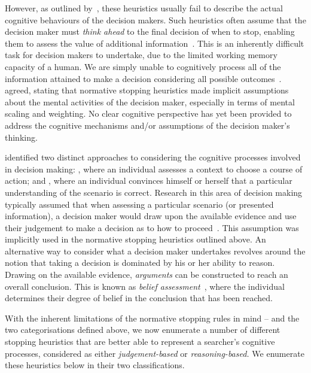 However, as outlined by~\cite{browne2004stopping_rules}, these heuristics usually fail to describe the actual cognitive behaviours of the decision makers. Such heuristics often assume that the decision maker must \emph{think ahead} to the final decision of when to stop, enabling them to assess the value of additional information~\citep{busemeyer1988deferred_decision_making}. This is an inherently difficult task for decision makers to undertake, due to the limited working memory capacity of a human. We are simply unable to cognitively process all of the information attained to make a decision considering all possible outcomes~\citep{browne2004stopping_rules}.~\cite{nickles1995judgment} agreed, stating that normative stopping heuristics made implicit assumptions about the mental activities of the decision maker, especially in terms of mental scaling and weighting. No clear cognitive perspective has yet been provided to address the cognitive mechanisms and/or assumptions of the decision maker's thinking.

\cite{nickles1995judgment} identified two distinct approaches to considering the cognitive processes involved in decision making: , where an individual assesses a context to choose a course of action; and , where an individual convinces himself or herself that a particular understanding of the scenario is correct. Research in this area of decision making typically assumed that when assessing a particular scenario (or presented information), a decision maker would draw upon the available evidence and use their judgement to make a decision as to how to proceed~\citep{reisberg1997cognition}. This assumption was implicitly used in the normative stopping heuristics outlined above. An alternative way to consider what a decision maker undertakes revolves around the notion that taking a decision is dominated by his or her ability to reason. Drawing on the available evidence, \emph{arguments} can be constructed to reach an overall conclusion. This is known as \emph{belief assessment}~\citep{benson1995belief_assessment}, where the individual determines their degree of belief in the conclusion that has been reached.

With the inherent limitations of the normative stopping rules in mind -- and the two categorisations defined above, we now enumerate a number of different stopping heuristics that are better able to represent a searcher's cognitive processes, considered as either \emph{judgement-based} or \emph{reasoning-based.} We enumerate these heuristics below in their two classifications.

